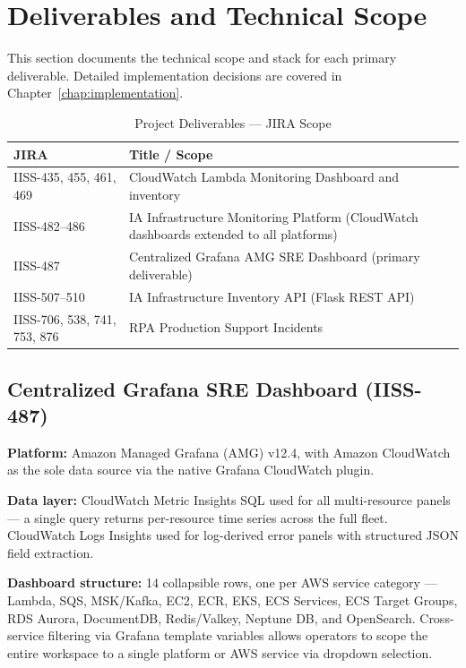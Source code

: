 \section{Deliverables and Technical Scope}
\label{sec:deliverables_scope}

This section documents the technical scope and stack for each primary
deliverable. Detailed implementation decisions are covered in
Chapter~\ref{chap:implementation}.

\begin{table}[ht]
\centering
\caption{Project Deliverables --- JIRA Scope}
\label{tab:jira_deliverables}
\begin{tabular}{p{2.2cm}p{9.5cm}}
\toprule
\textbf{JIRA} & \textbf{Title / Scope} \\
\midrule
IISS-435, 455, 461, 469 & CloudWatch Lambda Monitoring Dashboard and inventory \\
\midrule
IISS-482--486 & IA Infrastructure Monitoring Platform (CloudWatch dashboards extended to all platforms) \\
\midrule
IISS-487 & Centralized Grafana AMG SRE Dashboard (primary deliverable) \\
\midrule
IISS-507--510 & IA Infrastructure Inventory API (Flask REST API) \\
\midrule
IISS-706, 538, 741, 753, 876 & RPA Production Support Incidents \\
\bottomrule
\end{tabular}
\end{table}

\subsection{Centralized Grafana SRE Dashboard (IISS-487)}

\textbf{Platform:} Amazon Managed Grafana (AMG) v12.4, with Amazon
CloudWatch as the sole data source via the native Grafana CloudWatch
plugin.

\textbf{Data layer:} CloudWatch Metric Insights SQL used for all
multi-resource panels --- a single query returns per-resource time series
across the full fleet. CloudWatch Logs Insights used for log-derived
error panels with structured JSON field extraction.

\textbf{Dashboard structure:} 14 collapsible rows, one per AWS service
category --- Lambda, SQS, MSK/Kafka, EC2, ECR, EKS, ECS Services, ECS
Target Groups, RDS Aurora, DocumentDB, Redis/Valkey, Neptune DB, and
OpenSearch. Cross-service filtering via Grafana template variables allows
operators to scope the entire workspace to a single platform or AWS
service via dropdown selection.

